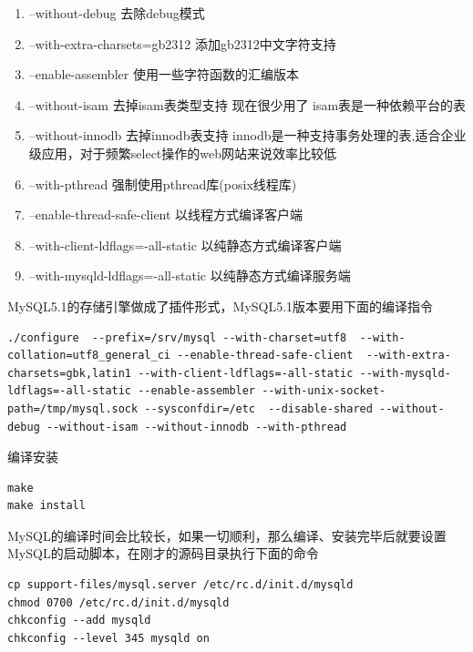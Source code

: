 \documentclass{article}
\begin{document}
\begin{enumerate}
\item --without-debug                                                        去除debug模式
\item --with-extra-charsets=gb2312                             添加gb2312中文字符支持
\item --enable-assembler                                                    使用一些字符函数的汇编版本
\item --without-isam                                                            去掉isam表类型支持 现在很少用了 isam表是一种依赖平台的表
\item --without-innodb                                                       去掉innodb表支持 innodb是一种支持事务处理的表,适合企业级应用，对于频繁select操作的web网站来说效率比较低
\item --with-pthread                                                            强制使用pthread库(posix线程库)
\item --enable-thread-safe-client                                    以线程方式编译客户端
\item --with-client-ldflags=-all-static                             以纯静态方式编译客户端
\item --with-mysqld-ldflags=-all-static                         以纯静态方式编译服务端 
\end{enumerate}

MySQL5.1的存储引擎做成了插件形式，MySQL5.1版本要用下面的编译指令

\begin{verbatim}
./configure  --prefix=/srv/mysql --with-charset=utf8  --with-collation=utf8_general_ci --enable-thread-safe-client  --with-extra-charsets=gbk,latin1 --with-client-ldflags=-all-static --with-mysqld-ldflags=-all-static --enable-assembler --with-unix-socket-path=/tmp/mysql.sock --sysconfdir=/etc  --disable-shared --without-debug --without-isam --without-innodb --with-pthread
\end{verbatim}
编译安装

\begin{verbatim}
make
make install
\end{verbatim}
MySQL的编译时间会比较长，如果一切顺利，那么编译、安装完毕后就要设置MySQL的启动脚本，在刚才的源码目录执行下面的命令

\begin{verbatim}
cp support-files/mysql.server /etc/rc.d/init.d/mysqld
chmod 0700 /etc/rc.d/init.d/mysqld
chkconfig --add mysqld
chkconfig --level 345 mysqld on
\end{verbatim}
\end{document}
